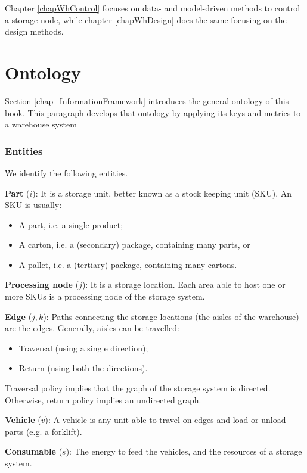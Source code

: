 Chapter \ref{chapWhControl} focuses on data- and model-driven methods to control a storage node, while chapter \ref{chapWhDesign} does the same focusing on the design methods.

\section{Ontology}
Section \ref{chap_InformationFramework} introduces the general ontology of this book. This paragraph develops that ontology by applying its keys and metrics to a warehouse system

\subsubsection{Entities}
We identify the following entities.\par
\textbf{Part} ($i$): It is a storage unit, better known as a stock keeping unit (SKU). An SKU is usually:
\begin{itemize}
    \item A part, i.e. a single product;
    \item A carton, i.e. a (secondary) package, containing many parts, or 
    \item A pallet, i.e. a (tertiary) package, containing many cartons.
\end{itemize}
\par

\textbf{Processing node} ($j$): It is a storage location. Each area able to host one or more SKUs is a processing node of the storage system. \par

\textbf{Edge} ($j,k$): Paths connecting the storage locations (the aisles of the warehouse) are the edges. Generally, aisles can be travelled:
\begin{itemize}
    \item Traversal (using a single direction);
    \item Return (using both the directions).
\end{itemize}
Traversal policy implies that the graph of the storage system is directed. Otherwise, return policy implies an undirected graph.
\par

\textbf{Vehicle} ($v$): A vehicle is any unit able to travel on edges and load or unload parts (e.g. a forklift). \par

\textbf{Consumable} ($s$): The energy to feed the vehicles, and the resources of a storage system.\par

